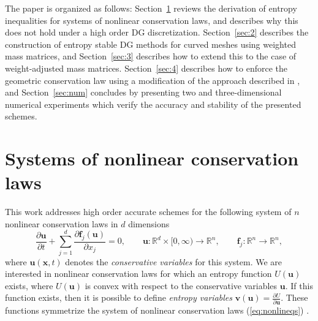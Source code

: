 \documentclass[10pt]{amsart}
\theoremstyle{definition}
\theoremstyle{lemma}
\theoremstyle{theorem}
\theoremstyle{assumption}
\newcommand{\pd}[2]{\frac{\partial#1}{\partial#2}}
\begin{document}
The paper is organized as follows: Section~\ref{sec:1} reviews the derivation of entropy inequalities for systems of nonlinear conservation laws, and describes why this does not hold under a high order DG discretization.  Section~\ref{sec:2} describes the construction of entropy stable DG methods for curved meshes using weighted mass matrices, and Section~\ref{sec:3} describes how to extend this to the case of weight-adjusted mass matrices.  Section~\ref{sec:4} describes how to enforce the geometric conservation law using a modification of the approach described in \cite{kopriva2006metric}, and Section~\ref{sec:num} concludes by presenting two and three-dimensional numerical experiments which verify the accuracy and stability of the presented schemes.  

\section{Systems of nonlinear conservation laws}
\label{sec:1}
This work addresses high order accurate schemes for the following system of $n$ nonlinear conservation laws in $d$ dimensions 
\begin{equation}
  \pd{\bm{u}}{t} + \sum_{j=1}^d\pd{\bm{f}_j(\bm{u})}{x_j}  = 0, \qquad \bm{u} : \mathbb{R}^d \times [0,\infty) \rightarrow  \mathbb{R}^n, \qquad \bm{f}_j : \mathbb{R}^n\rightarrow \mathbb{R}^n,
\label{eq:nonlineqs}
\end{equation}
where $\bm{u}(\bm{x},t)$ denotes the \emph{conservative variables} for this system.  %
We are interested in nonlinear conservation laws for which an entropy function $U(\bm{u})$ exists, where $U(\bm{u})$ is convex with respect to the conservative variables $\bm{u}$.  If this function exists, then it is possible to define \emph{entropy variables} $\bm{v}(\bm{u}) = \pd{U}{\bm{u}}$.  These functions symmetrize the system of nonlinear conservation laws (\ref{eq:nonlineqs}) \cite{hughes1986new}.  
\end{document}
